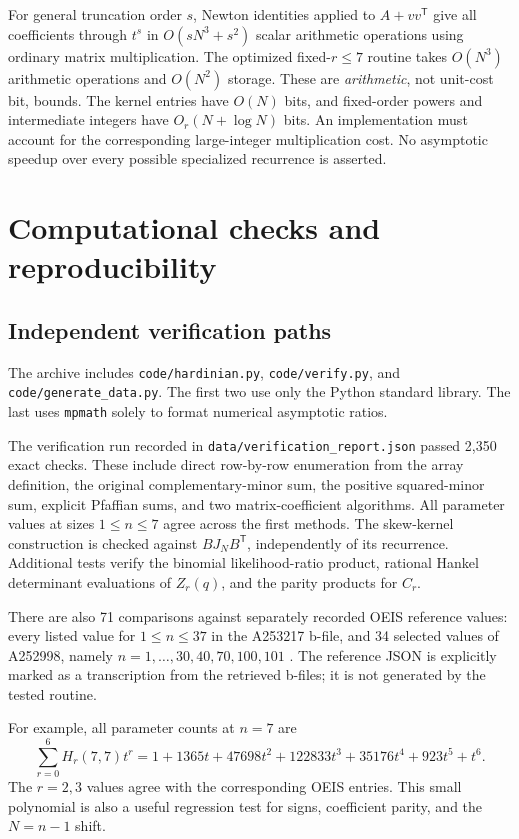 \documentclass[11pt]{article}
\numberwithin{equation}{section}
\theoremstyle{definition}
\begin{document}
For general truncation order $s$, Newton identities applied to $A+vv^{\mathsf T}$ give all coefficients through $t^s$ in $O(sN^3+s^2)$ scalar arithmetic operations using ordinary matrix multiplication. The optimized fixed-$r\leq7$ routine takes $O(N^3)$ arithmetic operations and $O(N^2)$ storage. These are \emph{arithmetic}, not unit-cost bit, bounds. The kernel entries have $O(N)$ bits, and fixed-order powers and intermediate integers have $O_r(N+\log N)$ bits. An implementation must account for the corresponding large-integer multiplication cost. No asymptotic speedup over every possible specialized recurrence is asserted.

\section{Computational checks and reproducibility}\label{sec:experiments}

\subsection{Independent verification paths}
The archive includes \texttt{code/hardinian.py}, \texttt{code/verify.py}, and \texttt{code/generate\_data.py}. The first two use only the Python standard library. The last uses \texttt{mpmath} solely to format numerical asymptotic ratios.

The verification run recorded in \texttt{data/verification\_report.json} passed 2,350 exact checks. These include direct row-by-row enumeration from the array definition, the original complementary-minor sum, the positive squared-minor sum, explicit Pfaffian sums, and two matrix-coefficient algorithms. All parameter values at sizes $1\leq n\leq7$ agree across the first methods. The skew-kernel construction is checked against $BJ_NB^{\mathsf T}$, independently of its recurrence. Additional tests verify the binomial likelihood-ratio product, rational Hankel determinant evaluations of $Z_r(q)$, and the parity products for $C_r$.

There are also 71 comparisons against separately recorded OEIS reference values: every listed value for $1\leq n\leq37$ in the A253217 b-file, and 34 selected values of A252998, namely $n=1,\ldots,30,40,70,100,101$ \cite{OEIS2,OEIS3}. The reference JSON is explicitly marked as a transcription from the retrieved b-files; it is not generated by the tested routine.

For example, all parameter counts at $n=7$ are
\begin{equation}\label{eq:n7poly}
 \sum_{r=0}^{6}H_r(7,7)t^r
 =1+1365t+47698t^2+122833t^3+35176t^4+923t^5+t^6.
\end{equation}
The $r=2,3$ values agree with the corresponding OEIS entries. This small polynomial is also a useful regression test for signs, coefficient parity, and the $N=n-1$ shift.
\end{document}
